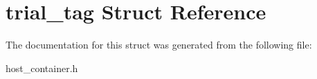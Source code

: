 \hypertarget{structtrial__tag}{}\section{trial\+\_\+tag Struct Reference}
\label{structtrial__tag}


The documentation for this struct was generated from the following file\+:\begin{DoxyCompactItemize}
\item 
host\+\_\+container.\+h\end{DoxyCompactItemize}
